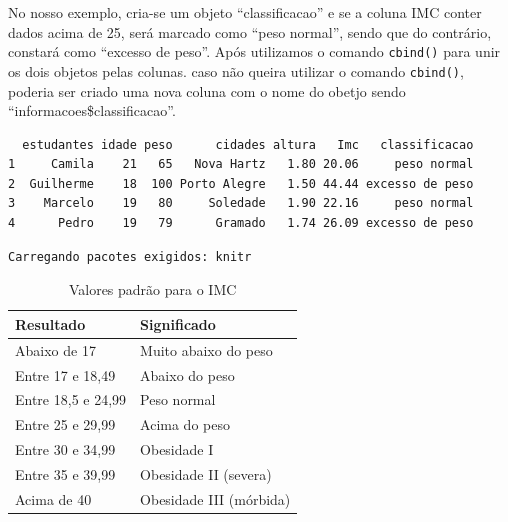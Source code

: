 \documentclass[12pt,brazil,oneside]{book}
\newenvironment{Shaded}{\begin{snugshade}}{\end{snugshade}}
\newcommand{\CommentTok}[1]{\textcolor[rgb]{0.56,0.35,0.01}{\textit{#1}}}
\newcommand{\DecValTok}[1]{\textcolor[rgb]{0.00,0.00,0.81}{#1}}
\newcommand{\KeywordTok}[1]{\textcolor[rgb]{0.13,0.29,0.53}{\textbf{#1}}}
\newcommand{\NormalTok}[1]{#1}
\newcommand{\OperatorTok}[1]{\textcolor[rgb]{0.81,0.36,0.00}{\textbf{#1}}}
\newcommand{\StringTok}[1]{\textcolor[rgb]{0.31,0.60,0.02}{#1}}
\begin{document}
No nosso exemplo, cria-se um objeto ``classificacao'' e se a coluna IMC conter dados acima de 25, será marcado como ``peso normal'', sendo que do contrário, constará como ``excesso de peso''. Após utilizamos o comando \texttt{cbind()} para unir os dois objetos pelas colunas. caso não queira utilizar o comando \texttt{cbind()}, poderia ser criado uma nova coluna com o nome do obetjo sendo ``informacoes\$classificacao''.

\begin{Shaded}
\end{Shaded}

\begin{verbatim}
  estudantes idade peso      cidades altura   Imc   classificacao
1     Camila    21   65   Nova Hartz   1.80 20.06     peso normal
2  Guilherme    18  100 Porto Alegre   1.50 44.44 excesso de peso
3    Marcelo    19   80     Soledade   1.90 22.16     peso normal
4      Pedro    19   79      Gramado   1.74 26.09 excesso de peso
\end{verbatim}

\begin{verbatim}
Carregando pacotes exigidos: knitr
\end{verbatim}

\begin{table}[t]

\caption{\label{tab:imct}Valores padrão para o IMC}
\centering
\begin{tabular}{l|l}
\hline
Resultado & Significado\\
\hline
Abaixo de 17 & Muito abaixo do peso\\
\hline
Entre 17 e 18,49 & Abaixo do peso\\
\hline
Entre 18,5 e 24,99 & Peso normal\\
\hline
Entre 25 e 29,99 & Acima do peso\\
\hline
Entre 30 e 34,99 & Obesidade I\\
\hline
Entre 35 e 39,99 & Obesidade II (severa)\\
\hline
Acima de 40 & Obesidade III (mórbida)\\
\hline
\end{tabular}
\end{table}
\end{document}
